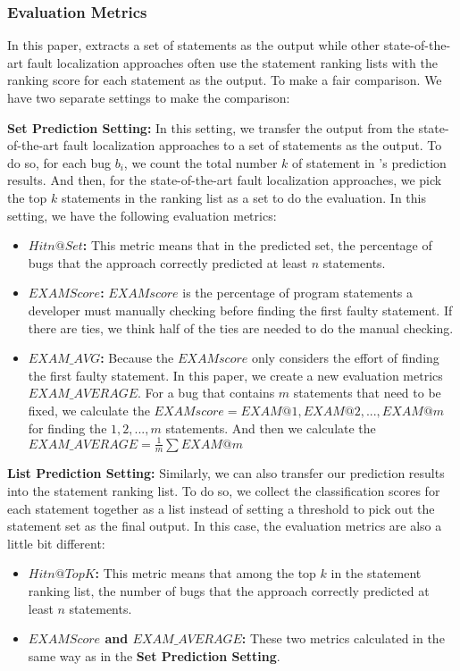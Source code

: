 \subsubsection{Evaluation Metrics}

In this paper, \tool extracts a set of statements as the output while other state-of-the-art fault localization approaches often use the statement ranking lists with the ranking score for each statement as the output. To make a fair comparison. We have two separate settings to make the comparison:

{\bf Set Prediction Setting:} In this setting, we transfer the output from the state-of-the-art fault localization approaches to a set of statements as the output. To do so, for each bug $b_i$, we count the total number $k$ of statement in \tool's prediction results. And then, for the state-of-the-art fault localization approaches, we pick the top $k$ statements in the ranking list as a set to do the evaluation. In this setting, we have the following evaluation metrics:

\begin{itemize}
	\item {\bf $Hit n @Set$:} This metric means that in the predicted set, the percentage of bugs that the approach correctly predicted at least $n$ statements.
	\item {\bf $EXAM Score$\cite{wong2008crosstab}:} $EXAM score$ is the percentage of program statements a developer must manually checking before finding the first faulty statement. If there are ties, we think half of the ties are needed to do the manual checking.
	\item{\bf $EXAM\_AVG$:} Because the $EXAM score$ only considers the effort of finding the first faulty statement. In this paper, we create a new evaluation metrics $EXAM\_AVERAGE$. For a bug that contains $m$ statements that need to be fixed, we calculate the $EXAM score = {EXAM@1, EXAM@2, ..., EXAM@m}$ for finding the $1, 2, ..., m$ statements. And then we calculate the $EXAM\_AVERAGE = \frac{1}{m}\sum EXAM@m$
\end{itemize}

{\bf List Prediction Setting:} Similarly, we can also transfer our prediction results into the statement ranking list. To do so, we collect the classification scores for each statement together as a list instead of setting a threshold to pick out the statement set as the final output. In this case, the evaluation metrics are also a little bit different:

\begin{itemize}
	\item {\bf $Hit n @ Top K$:} This metric means that among the top $k$ in the statement ranking list, the number of bugs that the approach correctly predicted at least $n$ statements.
	\item {\bf $EXAM Score$\cite{wong2008crosstab} and $EXAM\_AVERAGE$:} These two metrics calculated in the same way as in the {\bf Set Prediction Setting}.
\end{itemize}
